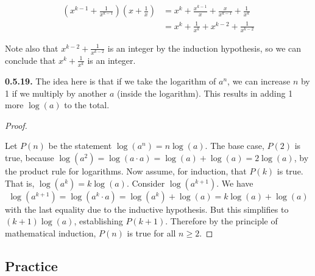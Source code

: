 \documentclass[12pt,]{book}
\theoremstyle{plain}
\theoremstyle{definition}
\theoremstyle{definition}
\theoremstyle{definition}
\numberwithin{equation}{chapter}
\newcommand{\amp}{&}
\begin{document}
\begin{align*}
\left(x^{k-1} + \frac{1}{x^{k-1}}\right)\left(x + \frac{1}{x}\right) \amp = x^k + \frac{x^{k-1}}{x} + \frac{x}{x^{k-1}} + \frac{1}{x^k}\\
\amp = x^k + \frac{1}{x^k} + x^{k-2} + \frac{1}{x^{k-2}}
\end{align*}
%
\par
\hypertarget{p-498}{}%
Note also that \(x^{k-2} + \frac{1}{x^{k-2}}\) is an integer by the induction hypothesis, so we can conclude that \(x^k + \frac{1}{x^k}\) is an integer.%
\par\smallskip
\noindent\textbf{0.5.19.} \hypertarget{p-500}{}%
The idea here is that if we take the logarithm of \(a^n\), we can increase \(n\) by 1 if we multiply by another \(a\) (inside the logarithm). This results in adding 1 more \(\log(a)\) to the total.%
\begin{proof}\hypertarget{proof-20}{}
\hypertarget{p-501}{}%
Let \(P(n)\) be the statement \(\log(a^n) = n \log(a)\). The base case, \(P(2)\) is true, because \(\log(a^2) = \log(a\cdot a) = \log(a) + \log(a) = 2\log(a)\), by the product rule for logarithms. Now assume, for induction, that \(P(k)\) is true. That is, \(\log(a^k) = k\log(a)\). Consider \(\log(a^{k+1})\). We have%
\begin{equation*}
\log(a^{k+1}) = \log(a^k\cdot a) = \log(a^k) + \log(a) = k\log(a) + \log(a)
\end{equation*}
with the last equality due to the inductive hypothesis. But this simplifies to \((k+1) \log(a)\), establishing \(P(k+1)\). Therefore by the principle of mathematical induction, \(P(n)\) is true for all \(n \ge 2\).%
\end{proof}
\par\smallskip
\subsection*{ Practice}
\end{document}
